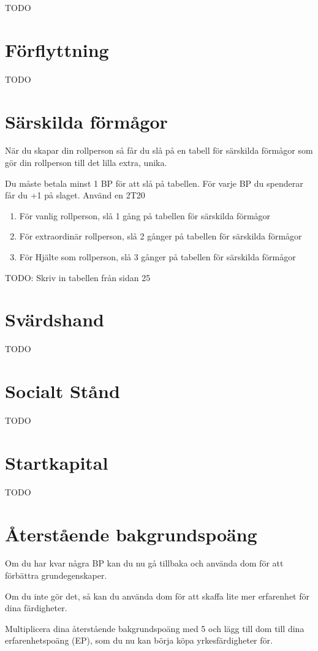 \documentclass[a4paper, 10pt, titlepage]{article}
\begin{document}
TODO

\section{Förflyttning}

TODO

\section{Särskilda förmågor}
När du skapar din rollperson så får du slå på en tabell för särskilda förmågor
som gör din rollperson till det lilla extra, unika.

Du måste betala minst 1 BP för att slå på tabellen. För varje BP du spenderar
får du +1 på slaget. Använd en 2T20

\begin{enumerate}[x]
  \item För vanlig rollperson, slå 1 gång på tabellen för särskilda förmågor
  \item För extraordinär rollperson, slå 2 gånger på tabellen för särskilda förmågor
  \item För Hjälte som rollperson, slå 3 gånger på tabellen för särskilda förmågor
\end{enumerate}

TODO: Skriv in tabellen från sidan 25

\section{Svärdshand}
TODO

\section{Socialt Stånd}
TODO

\section{Startkapital}
TODO

\section{Återstående bakgrundspoäng}
Om du har kvar några BP kan du nu gå tillbaka och använda dom för att
förbättra grundegenskaper.

Om du inte gör det, så kan du använda dom för att skaffa lite mer erfarenhet
för dina färdigheter.

Multiplicera dina återstående bakgrundspoäng med 5 och lägg till dom till dina
erfarenhetspoäng (EP), som du nu kan börja köpa yrkesfärdigheter för.
\end{document}
